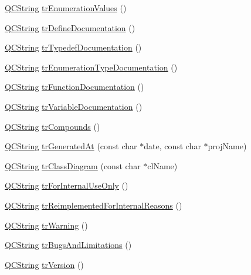 \begin{DoxyCompactItemize}
\hyperlink{class_q_c_string}{Q\+C\+String} \hyperlink{class_translator_polish_acc1f2f424ed7b646b977d05bc05bc44f}{tr\+Enumeration\+Values} ()
\item 
\hyperlink{class_q_c_string}{Q\+C\+String} \hyperlink{class_translator_polish_aae92c2bc5e08a531f02642f5250656fd}{tr\+Define\+Documentation} ()
\item 
\hyperlink{class_q_c_string}{Q\+C\+String} \hyperlink{class_translator_polish_a383494e2858ddb74722dd7dc5ca074a0}{tr\+Typedef\+Documentation} ()
\item 
\hyperlink{class_q_c_string}{Q\+C\+String} \hyperlink{class_translator_polish_a7f0fea215fca2d7bb011d5c8c24fe762}{tr\+Enumeration\+Type\+Documentation} ()
\item 
\hyperlink{class_q_c_string}{Q\+C\+String} \hyperlink{class_translator_polish_a188cef323586d441f24e08219f6e91ef}{tr\+Function\+Documentation} ()
\item 
\hyperlink{class_q_c_string}{Q\+C\+String} \hyperlink{class_translator_polish_ae02bdc7d806b48abbc262905706d8b29}{tr\+Variable\+Documentation} ()
\item 
\hyperlink{class_q_c_string}{Q\+C\+String} \hyperlink{class_translator_polish_a19efe93e03eabd2768c0db860d823c2e}{tr\+Compounds} ()
\item 
\hyperlink{class_q_c_string}{Q\+C\+String} \hyperlink{class_translator_polish_a80e062bbff8e4ee541ac336cbe8943b7}{tr\+Generated\+At} (const char $\ast$date, const char $\ast$proj\+Name)
\item 
\hyperlink{class_q_c_string}{Q\+C\+String} \hyperlink{class_translator_polish_a9c1f72c3c22421dc45c3cb5986eeaa29}{tr\+Class\+Diagram} (const char $\ast$cl\+Name)
\item 
\hyperlink{class_q_c_string}{Q\+C\+String} \hyperlink{class_translator_polish_a75a159a05f97393a3032f4a7a9e0814f}{tr\+For\+Internal\+Use\+Only} ()
\item 
\hyperlink{class_q_c_string}{Q\+C\+String} \hyperlink{class_translator_polish_a53c90cda5eeb567fafc0d620c9b30d03}{tr\+Reimplemented\+For\+Internal\+Reasons} ()
\item 
\hyperlink{class_q_c_string}{Q\+C\+String} \hyperlink{class_translator_polish_ac2c102476e3c367afb549e97883f5df1}{tr\+Warning} ()
\item 
\hyperlink{class_q_c_string}{Q\+C\+String} \hyperlink{class_translator_polish_ab7054cfc596a6882e0d8e1911ead33a7}{tr\+Bugs\+And\+Limitations} ()
\item 
\hyperlink{class_q_c_string}{Q\+C\+String} \hyperlink{class_translator_polish_a50ad2c9bf96d94a8a21a464b81a4ab3c}{tr\+Version} ()

\end{DoxyCompactItemize}
